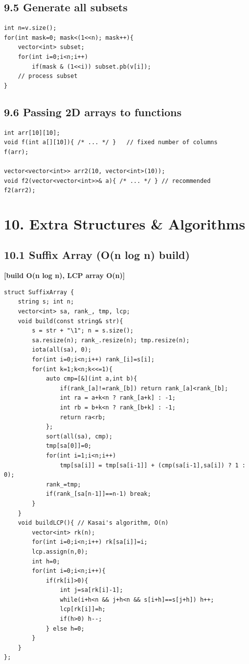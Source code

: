 \documentclass[11pt]{extarticle}
\newcommand{\comp}[1]{\textbf{[#1]}\\}
\begin{document}
\subsection*{9.5 Generate all subsets}
\begin{lstlisting}
int n=v.size();
for(int mask=0; mask<(1<<n); mask++){
    vector<int> subset;
    for(int i=0;i<n;i++)
        if(mask & (1<<i)) subset.pb(v[i]);
    // process subset
}
\end{lstlisting}

\subsection*{9.6 Passing 2D arrays to functions}
\begin{lstlisting}
int arr[10][10];
void f(int a[][10]){ /* ... */ }   // fixed number of columns
f(arr);

vector<vector<int>> arr2(10, vector<int>(10));
void f2(vector<vector<int>>& a){ /* ... */ } // recommended
f2(arr2);
\end{lstlisting}

\section*{10. Extra Structures \& Algorithms}
\subsection*{10.1 Suffix Array (O(n log n) build)}
\comp{build O(n log n), LCP array O(n)}
\begin{lstlisting}
struct SuffixArray {
    string s; int n;
    vector<int> sa, rank_, tmp, lcp;
    void build(const string& str){
        s = str + "\1"; n = s.size();
        sa.resize(n); rank_.resize(n); tmp.resize(n);
        iota(all(sa), 0);
        for(int i=0;i<n;i++) rank_[i]=s[i];
        for(int k=1;k<n;k<<=1){
            auto cmp=[&](int a,int b){
                if(rank_[a]!=rank_[b]) return rank_[a]<rank_[b];
                int ra = a+k<n ? rank_[a+k] : -1;
                int rb = b+k<n ? rank_[b+k] : -1;
                return ra<rb;
            };
            sort(all(sa), cmp);
            tmp[sa[0]]=0;
            for(int i=1;i<n;i++)
                tmp[sa[i]] = tmp[sa[i-1]] + (cmp(sa[i-1],sa[i]) ? 1 : 0);
            rank_=tmp;
            if(rank_[sa[n-1]]==n-1) break;
        }
    }
    void buildLCP(){ // Kasai's algorithm, O(n)
        vector<int> rk(n);
        for(int i=0;i<n;i++) rk[sa[i]]=i;
        lcp.assign(n,0);
        int h=0;
        for(int i=0;i<n;i++){
            if(rk[i]>0){
                int j=sa[rk[i]-1];
                while(i+h<n && j+h<n && s[i+h]==s[j+h]) h++;
                lcp[rk[i]]=h;
                if(h>0) h--;
            } else h=0;
        }
    }
};
\end{lstlisting}
\end{document}
